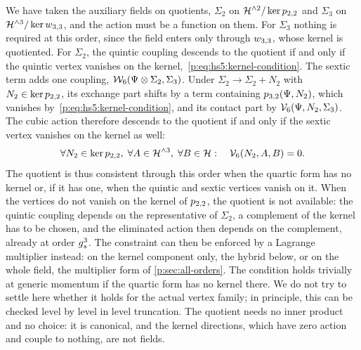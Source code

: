We have taken the auxiliary fields on quotients, $\Sigma_2$ on $\mathcal{H}^{\wedge 2} / \ker p_{2,2}$ and $\Sigma_3$ on $\mathcal{H}^{\wedge 3} / \ker w_{3,3}$, and the action must be a function on them.
  For $\Sigma_3$ nothing is required at this order, since the field enters only through $w_{3,3}$, whose kernel is quotiented.
  For $\Sigma_2$, the quintic coupling descends to the quotient if and only if the quintic vertex vanishes on the kernel,~\eqref{p:eq:hs5:kernel-condition}.
  The sextic term adds one coupling, $\mathcal{W}_{6}(\Psi \otimes \Sigma_2, \Sigma_3)$.
  Under $\Sigma_2 \to \Sigma_2 + N_2$ with $N_2 \in \ker p_{2,2}$, its exchange part shifts by a term containing $p_{3,2}(\Psi, N_2)$, which vanishes by~\eqref{p:eq:hs5:kernel-condition}, and its contact part by $\mathcal{V}_{6}(\Psi, N_2, \Sigma_3)$.
  The cubic action therefore descends to the quotient if and only if the sextic vertex vanishes on the kernel as well:
  \begin{equation}
  \label{p:eq:hs6:kernel-condition}
  \forall N_2 \in \ker p_{2,2}, \;
  \forall A \in \mathcal{H}^{\wedge 3}, \;
  \forall B \in \mathcal{H}:
  \quad
  \mathcal{V}_{6}(N_2, A, B)
    = 0.
\end{equation}
  The quotient is thus consistent through this order when the quartic form has no kernel or, if it has one, when the quintic and sextic vertices vanish on it.
  When the vertices do not vanish on the kernel of $p_{2,2}$, the quotient is not available: the quintic coupling depends on the representative of $\Sigma_2$, a complement of the kernel has to be chosen, and the eliminated action then depends on the complement, already at order $g_s^3$.
  The constraint can then be enforced by a Lagrange multiplier instead: on the kernel component only, the hybrid below, or on the whole field, the multiplier form of \cref{p:sec:all-orders}.
  The condition holds trivially at generic momentum if the quartic form has no kernel there.
  We do not try to settle here whether it holds for the actual vertex family; in principle, this can be checked level by level in level truncation.
  The quotient needs no inner product and no choice: it is canonical, and the kernel directions, which have zero action and couple to nothing, are not fields.

